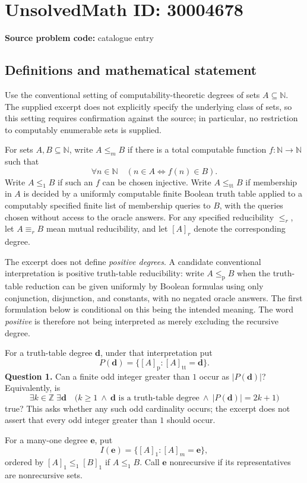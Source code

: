 \documentclass[11pt]{article}
\newcommand{\N}{\mathbb{N}}
\newcommand{\Z}{\mathbb{Z}}
\begin{document}
\section*{UnsolvedMath ID: 30004678}
\textbf{Source problem code:} catalogue entry
\subsection{Definitions and mathematical statement}
Use the conventional setting of computability-theoretic degrees of sets \(A\subseteq\N\). The supplied excerpt does not explicitly specify the underlying class of sets, so this setting requires confirmation against the source; in particular, no restriction to computably enumerable sets is supplied.

For sets \(A,B\subseteq\N\), write \(A\leq_m B\) if there is a total computable function \(f:\N\to\N\) such that
\[
\forall n\in\N\quad(n\in A\iff f(n)\in B).
\]
Write \(A\leq_1 B\) if such an \(f\) can be chosen injective. Write \(A\leq_{\mathrm{tt}}B\) if membership in \(A\) is decided by a uniformly computable finite Boolean truth table applied to a computably specified finite list of membership queries to \(B\), with the queries chosen without access to the oracle answers. For any specified reducibility \(\leq_r\), let \(A\equiv_r B\) mean mutual reducibility, and let \([A]_r\) denote the corresponding degree.

The excerpt does not define \emph{positive degrees}. A candidate conventional interpretation is positive truth-table reducibility: write \(A\leq_{\mathrm p}B\) when the truth-table reduction can be given uniformly by Boolean formulas using only conjunction, disjunction, and constants, with no negated oracle answers. The first formulation below is conditional on this being the intended meaning. The word \emph{positive} is therefore not being interpreted as merely excluding the recursive degree.

For a truth-table degree \(\mathbf d\), under that interpretation put
\[
P(\mathbf d)=\{[A]_{\mathrm p}:[A]_{\mathrm{tt}}=\mathbf d\}.
\]
\textbf{Question 1.} Can a finite odd integer greater than \(1\) occur as \(|P(\mathbf d)|\)? Equivalently, is
\[
\exists k\in\Z\;\exists\mathbf d\quad
\bigl(k\geq1\ \land\ \mathbf d\text{ is a truth-table degree}\ \land\ |P(\mathbf d)|=2k+1\bigr)
\]
true? This asks whether any such odd cardinality occurs; the excerpt does not assert that every odd integer greater than \(1\) should occur.

For a many-one degree \(\mathbf e\), put
\[
I(\mathbf e)=\{[A]_1:[A]_m=\mathbf e\},
\]
ordered by \([A]_1\leq_1[B]_1\) if \(A\leq_1B\). Call \(\mathbf e\) nonrecursive if its representatives are nonrecursive sets.
\end{document}
